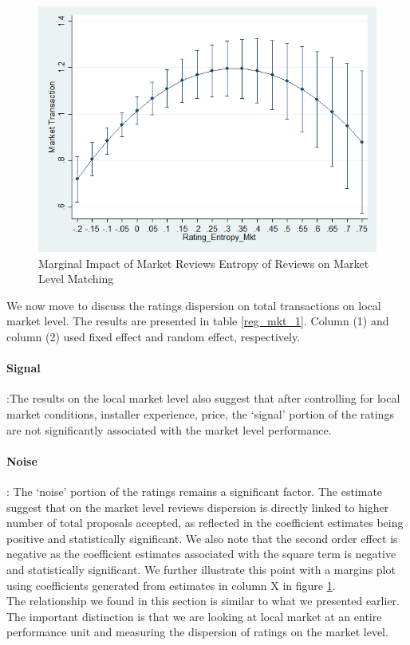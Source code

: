 \documentclass[msom,blindrev]{informs3}
\begin{document}
\begin{figure}
	\centering
	\includegraphics[width=0.7\linewidth]{marginsplot_entmkt.png}
	\caption{Marginal Impact of Market Reviews Entropy of Reviews on Market Level Matching}
	\label{marginsplot_mkt_entmkt}
\end{figure}

We now move to discuss the ratings dispersion on total transactions on local market level. The results are presented in table \ref{reg_mkt_1}. Column (1) and column (2) used fixed effect and random effect, respectively.
\paragraph{Signal}:The results on the local market level also suggest that after controlling for local market conditions, installer experience, price, the `signal' portion of the ratings are not significantly associated with the market level performance.
\paragraph{Noise}: The `noise' portion of the ratings remains a significant factor. The estimate suggest that on the market level reviews dispersion is directly linked to higher number of total proposals accepted, as reflected in the coefficient estimates being positive and statistically significant. We also note that the second order effect is negative as the coefficient estimates associated with the square term is negative and statistically significant. We further illustrate this point with a margins plot using coefficients generated from estimates in column X in figure \ref{marginsplot_mkt_entmkt}. \\
The relationship we found in this section is similar to what we presented earlier. The important distinction is that we are looking at local market at an entire performance unit and measuring the dispersion of ratings on the market level.
\end{document}
